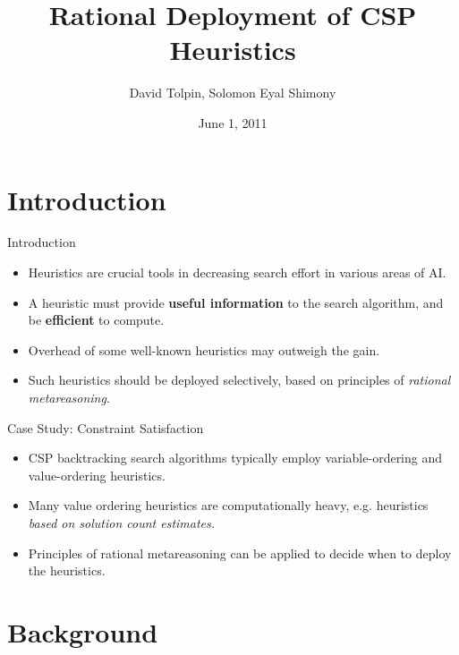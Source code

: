 \documentclass{beamer}
\title{Rational Deployment of CSP Heuristics}
\author{David Tolpin, Solomon Eyal Shimony}
\institute{Ben-Gurion University of the Negev\\Beer Sheva, Israel}
\date{June 1, 2011}
\begin{document}
\begin{frame}
\titlepage
\end{frame}

\section{Introduction}

\begin{frame}{Introduction}
\begin{itemize}
\item Heuristics are crucial tools in decreasing search effort in
  various areas of AI.
\item A heuristic must provide {\bf useful information} to the search algorithm,
  and be {\bf efficient} to compute.
\item Overhead of some well-known heuristics may outweigh the gain.
\item Such heuristics should be deployed selectively, based on
  principles of {\it rational metareasoning}.
\end{itemize}

\end{frame}

\begin{frame}{Case Study: Constraint Satisfaction}
\begin{itemize}
\item CSP backtracking search algorithms typically employ
  variable-ordering and value-ordering heuristics.
\item Many value ordering heuristics are computationally
  heavy, e.g. heuristics {\it based on solution count
          estimates.}
\item Principles of rational metareasoning can be applied
          to decide when to deploy the heuristics.
\end{itemize}
\end{frame}

\section{Background}
\end{document}
